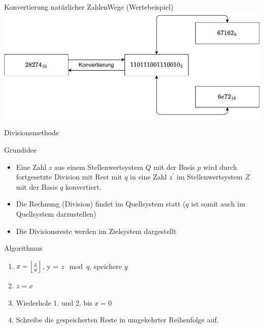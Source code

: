 \documentclass[xelatex,aspectratio=169]{beamer}
\begin{document}
\begin{frame}{Konvertierung natürlicher Zahlen}{Wege (Wertebeispiel)}
  \includegraphics[width=\textwidth]{fig/zahlensysteme_umwandlung_werte.pdf}
\end{frame}

\begin{frame}{Divisionsmethode}
    \begin{block}{Grundidee}
        \begin{itemize}
            \item Eine Zahl $z$ aus einem Stellenwertsystem $Q$ mit der Basis $p$ wird durch fortgesetzte Division mit Rest mit $q$ in eine Zahl $z^{'}$ im Stellenwertsystem $Z$ mit der Basis $q$ konvertiert.
            \item Die Rechnung (Division) findet im Quellsystem statt ($q$ ist somit auch im Quellsystem darzustellen)
            \item Die Divisionsreste werden im Zielsystem dargestellt
        \end{itemize}
    \end{block}
    \begin{block}{Algorithmus}
        \begin{enumerate}
            \item $x = \floor*{\frac{z}{q}}$, y = $z \mod q$, speichere $y$
            \item $z = x$
            \item Wiederhole 1. und 2. bis $x = 0$
            \item Schreibe die gespeicherten Reste in umgekehrter Reihenfolge auf.
        \end{enumerate}

    \end{block}

\end{frame}
\end{document}
